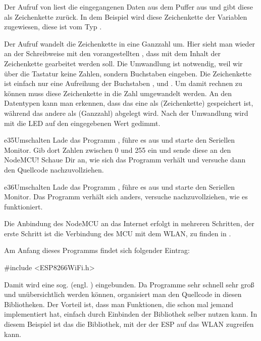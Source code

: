 Der Aufruf von  liest die eingegangenen Daten aus dem Puffer aus und 
gibt diese als Zeichenkette zurück. In dem Beispiel wird diese Zeichenkette der Variablen 
 zugewiesen, diese ist vom Typ .

Der Aufruf  wandelt die Zeichenkette in eine Ganzzahl um. Hier sieht man wieder
an der Schreibweise mit den vorangestellten , dass mit dem Inhalt der Zeichenkette
gearbeitet werden soll. Die Umwandlung ist notwendig, weil wir über die Tastatur keine Zahlen,
sondern Buchstaben eingeben. Die Zeichenkette  ist einfach nur eine Aufreihung der 
Buchstaben ,  und . Um damit rechnen zu können muss diese Zeichenkette
in die Zahl  umgewandelt werden. An den Datentypen kann man erkennen, dass das eine als 
 (Zeichenkette) gespeichert ist, während das andere als  (Ganzzahl) 
abgelegt wird. Nach der Umwandlung wird mit  die LED auf den eingegebenen Wert gedimmt.


\begin{excercise}{e35}{Umschalten}
Lade das Programm , führe es aus und starte den Seriellen Monitor.
Gib dort Zahlen zwischen 0 und 255 ein und sende diese an den NodeMCU!
Schaue Dir an, wie sich das Programm verhält und versuche dann den Quellcode nachzuvollziehen.
\end{excercise}
\vfill\null\pagebreak
\begin{excercise}{e36}{Umschalten}
Lade das Programm , führe es aus und starte den Seriellen Monitor.
Das Programm verhält sich anders, versuche nachzuvollziehen, wie es funktioniert.
\end{excercise}



Die Anbindung des NodeMCU an das Internet erfolgt in mehreren Schritten, der erste Schritt ist die 
Verbindung des MCU mit dem WLAN, zu finden in . 


Am Anfang dieses Programms findet sich folgender Eintrag:
\begin{src}
#include <ESP8266WiFi.h>
\end{src}

Damit wird eine sog.  (engl. ) eingebunden. Da Programme
sehr schnell sehr groß und unübersichtlich werden können, organisiert man den Quellcode in diesen Bibliotheken.
Der Vorteil ist, dass man Funktionen, die schon mal jemand implementiert hat, einfach durch Einbinden
der Bibliothek selber nutzen kann. In diesem Beispiel ist das die Bibliothek, mit der der ESP auf das WLAN zugreifen kann.

